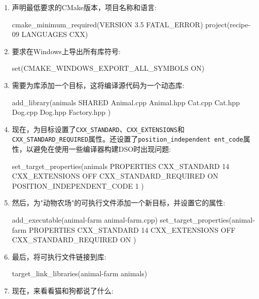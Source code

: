 \begin{enumerate}
\item 声明最低要求的CMake版本，项目名称和语言:

\begin{codebox}[cmake]
cmake_minimum_required(VERSION 3.5 FATAL_ERROR)
project(recipe-09 LANGUAGES CXX)
\end{codebox}

\item 要求在Windows上导出所有库符号:

\begin{codebox}[cmake]
set(CMAKE_WINDOWS_EXPORT_ALL_SYMBOLS ON)
\end{codebox}

\item 需要为库添加一个目标，这将编译源代码为一个动态库:

\begin{codebox}[cmake]
add_library(animals
  SHARED
    Animal.cpp
    Animal.hpp
    Cat.cpp
    Cat.hpp
    Dog.cpp
    Dog.hpp
    Factory.hpp
  )
\end{codebox}

\item 现在，为目标设置了\texttt{CXX\_STANDARD}、\texttt{CXX\_EXTENSIONS}和\texttt{CXX\_STANDARD\_REQUIRED}属性。还设置了\texttt{position\_independent ent\_code}属性，以避免在使用一些编译器构建DSO时出现问题:

\begin{codebox}[cmake]
set_target_properties(animals
  PROPERTIES
    CXX_STANDARD 14
    CXX_EXTENSIONS OFF
    CXX_STANDARD_REQUIRED ON
    POSITION_INDEPENDENT_CODE 1
)
\end{codebox}

\item 然后，为"动物农场"的可执行文件添加一个新目标，并设置它的属性:

\begin{codebox}[cmake]
add_executable(animal-farm animal-farm.cpp)
set_target_properties(animal-farm
  PROPERTIES
    CXX_STANDARD 14
    CXX_EXTENSIONS OFF
    CXX_STANDARD_REQUIRED ON
  )
\end{codebox}

\item 最后，将可执行文件链接到库:

\begin{codebox}[cmake]
target_link_libraries(animal-farm animals)
\end{codebox}

\item 现在，来看看猫和狗都说了什么:


\end{enumerate}

